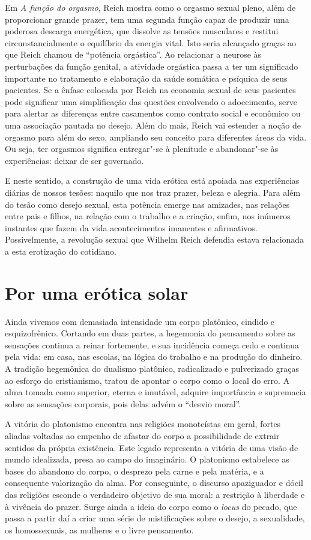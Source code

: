 Em \emph{A função do orgasmo}, Reich mostra como o orgasmo sexual
pleno, além de proporcionar grande prazer, tem uma segunda função capaz
de produzir uma poderosa descarga energética, que dissolve as tensões
musculares e restitui circunstancialmente o equilíbrio da energia vital.
Isto seria alcançado graças ao que Reich chamou de ``potência
orgástica''. Ao relacionar a neurose às perturbações da função genital,
a atividade orgástica passa a ter um significado importante no
tratamento e elaboração da saúde somática e psíquica de seus pacientes.
Se a ênfase colocada por Reich na economia sexual de seus pacientes pode
significar uma simplificação das questões envolvendo o adoecimento,
serve para alertar as diferenças entre casamentos como contrato social e
econômico ou uma associação pautada no desejo. Além do mais, Reich vai
estender a noção de orgasmo para além do sexo, ampliando seu conceito
para diferentes áreas da vida. Ou seja, ter orgasmos significa
entregar"-se à plenitude e abandonar"-se às experiências: deixar de ser
governado.

E neste sentido, a construção de uma vida erótica está apoiada nas
experiências diárias de nossos tesões: naquilo que nos traz prazer,
beleza e alegria. Para além do tesão como desejo sexual, esta potência
emerge nas amizades, nas relações entre pais e filhos, na relação com o
trabalho e a criação, enfim, nos inúmeros instantes que fazem da vida
acontecimentos imanentes e afirmativos. Possivelmente, a revolução
sexual que Wilhelm Reich defendia estava relacionada a esta erotização
do cotidiano.

\section{Por uma erótica solar}

Ainda vivemos com demasiada intensidade um corpo platônico, cindido e
esquizofrênico. Cortando em duas partes, a hegemonia do pensamento sobre
as sensações continua a reinar fortemente, e sua incidência começa cedo
e continua pela vida: em casa, nas escolas, na lógica do trabalho e na
produção do dinheiro. A tradição hegemônica do dualismo platônico,
radicalizado e pulverizado graças ao esforço do cristianismo, tratou de
apontar o corpo como o local do erro. A alma tomada como superior,
eterna e imutável, adquire importância e supremacia sobre as sensações
corporais, pois delas advém o ``desvio moral''.

A vitória do platonismo encontra nas religiões monoteístas em geral,
fortes aliadas voltadas ao empenho de afastar do corpo a possibilidade
de extrair sentidos da própria existência. Este legado representa a
vitória de uma visão de mundo idealizada, presa ao campo do imaginário.
O platonismo estabelece as bases do abandono do corpo, o desprezo pela
carne e pela matéria, e a consequente valorização da alma. Por
conseguinte, o discurso apaziguador e dócil das religiões esconde o
verdadeiro objetivo de sua moral: a restrição à liberdade e à vivência
do prazer. Surge ainda a ideia do corpo como o \emph{locus} do pecado,
que passa a partir daí a criar uma série de mistificações sobre o
desejo, a sexualidade, os homossexuais, as mulheres e o livre
pensamento.

